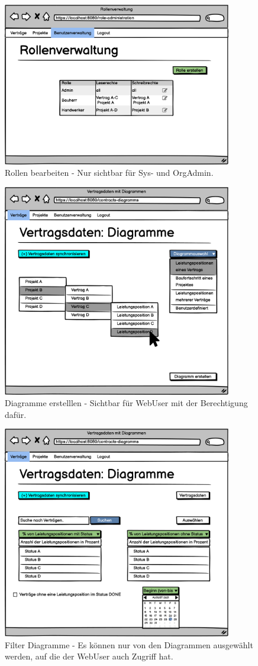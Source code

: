 \begin{figure}[h]
\centering
\includegraphics[width=10cm]{img/mockup_web/admin-roles.png}
\caption{Rollen bearbeiten - Nur sichtbar für Sys- und OrgAdmin.}
\end{figure}

\begin{figure}[h]
\centering
\includegraphics[width=10cm]{img/mockup_web/Erstellung Diagramme.png}
\caption{Diagramme erstelllen - Sichtbar für WebUser mit der Berechtigung dafür.}
\end{figure}

\begin{figure}[h]
	\centering
	\includegraphics[width=10cm]{img/mockup_web/Filter Diagramme.png}
	\caption{Filter Diagramme - Es können nur von den Diagrammen ausgewählt werden, auf die der WebUser auch Zugriff hat.}
\end{figure}


